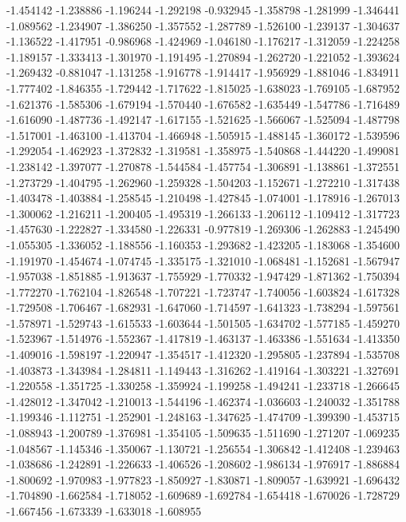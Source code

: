 -1.454142
-1.238886
-1.196244
-1.292198
-0.932945
-1.358798
-1.281999
-1.346441
-1.089562
-1.234907
-1.386250
-1.357552
-1.287789
-1.526100
-1.239137
-1.304637
-1.136522
-1.417951
-0.986968
-1.424969
-1.046180
-1.176217
-1.312059
-1.224258
-1.189157
-1.333413
-1.301970
-1.191495
-1.270894
-1.262720
-1.221052
-1.393624
-1.269432
-0.881047
-1.131258
-1.916778
-1.914417
-1.956929
-1.881046
-1.834911
-1.777402
-1.846355
-1.729442
-1.717622
-1.815025
-1.638023
-1.769105
-1.687952
-1.621376
-1.585306
-1.679194
-1.570440
-1.676582
-1.635449
-1.547786
-1.716489
-1.616090
-1.487736
-1.492147
-1.617155
-1.521625
-1.566067
-1.525094
-1.487798
-1.517001
-1.463100
-1.413704
-1.466948
-1.505915
-1.488145
-1.360172
-1.539596
-1.292054
-1.462923
-1.372832
-1.319581
-1.358975
-1.540868
-1.444220
-1.499081
-1.238142
-1.397077
-1.270878
-1.544584
-1.457754
-1.306891
-1.138861
-1.372551
-1.273729
-1.404795
-1.262960
-1.259328
-1.504203
-1.152671
-1.272210
-1.317438
-1.403478
-1.403884
-1.258545
-1.210498
-1.427845
-1.074001
-1.178916
-1.267013
-1.300062
-1.216211
-1.200405
-1.495319
-1.266133
-1.206112
-1.109412
-1.317723
-1.457630
-1.222827
-1.334580
-1.226331
-0.977819
-1.269306
-1.262883
-1.245490
-1.055305
-1.336052
-1.188556
-1.160353
-1.293682
-1.423205
-1.183068
-1.354600
-1.191970
-1.454674
-1.074745
-1.335175
-1.321010
-1.068481
-1.152681
-1.567947
-1.957038
-1.851885
-1.913637
-1.755929
-1.770332
-1.947429
-1.871362
-1.750394
-1.772270
-1.762104
-1.826548
-1.707221
-1.723747
-1.740056
-1.603824
-1.617328
-1.729508
-1.706467
-1.682931
-1.647060
-1.714597
-1.641323
-1.738294
-1.597561
-1.578971
-1.529743
-1.615533
-1.603644
-1.501505
-1.634702
-1.577185
-1.459270
-1.523967
-1.514976
-1.552367
-1.417819
-1.463137
-1.463386
-1.551634
-1.413350
-1.409016
-1.598197
-1.220947
-1.354517
-1.412320
-1.295805
-1.237894
-1.535708
-1.403873
-1.343984
-1.284811
-1.149443
-1.316262
-1.419164
-1.303221
-1.327691
-1.220558
-1.351725
-1.330258
-1.359924
-1.199258
-1.494241
-1.233718
-1.266645
-1.428012
-1.347042
-1.210013
-1.544196
-1.462374
-1.036603
-1.240032
-1.351788
-1.199346
-1.112751
-1.252901
-1.248163
-1.347625
-1.474709
-1.399390
-1.453715
-1.088943
-1.200789
-1.376981
-1.354105
-1.509635
-1.511690
-1.271207
-1.069235
-1.048567
-1.145346
-1.350067
-1.130721
-1.256554
-1.306842
-1.412408
-1.239463
-1.038686
-1.242891
-1.226633
-1.406526
-1.208602
-1.986134
-1.976917
-1.886884
-1.800692
-1.970983
-1.977823
-1.850927
-1.830871
-1.809057
-1.639921
-1.696432
-1.704890
-1.662584
-1.718052
-1.609689
-1.692784
-1.654418
-1.670026
-1.728729
-1.667456
-1.673339
-1.633018
-1.608955

